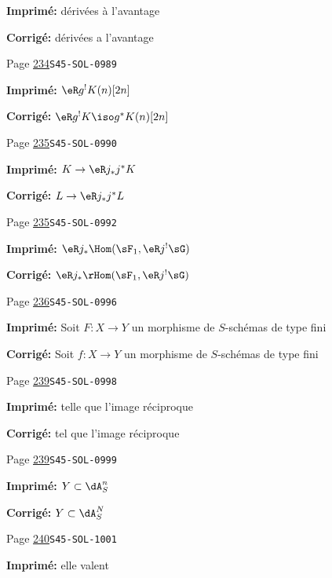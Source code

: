 \begin{description}
\par\noindent\textbf{Imprimé:} dérivées à l'avantage
\par\noindent\textbf{Corrigé:} dérivées a l'avantage
\smallskip
\item[\hypertarget{apparatus:FR-0247}{247}] Page \hyperlink{printpage:fr:234}{234}\quad\texttt{S45-SOL-0989}
\par\noindent\textbf{Imprimé:} \(\eR g^! K(n)[2 n]\)
\par\noindent\textbf{Corrigé:} \(\eR g^! K \iso g^\ast K(n)[2 n]\)
\smallskip
\item[\hypertarget{apparatus:FR-0248}{248}] Page \hyperlink{printpage:fr:235}{235}\quad\texttt{S45-SOL-0990}
\par\noindent\textbf{Imprimé:} \(K\to \eR j_\ast j^\ast K\)
\par\noindent\textbf{Corrigé:} \(L\to \eR j_\ast j^\ast L\)
\smallskip
\item[\hypertarget{apparatus:FR-0249}{249}] Page \hyperlink{printpage:fr:235}{235}\quad\texttt{S45-SOL-0992}
\par\noindent\textbf{Imprimé:} \(\eR j_\ast \Hom(\sF_1,\eR j^! \sG)\)
\par\noindent\textbf{Corrigé:} \(\eR j_\ast \rHom(\sF_1,\eR j^! \sG)\)
\smallskip
\item[\hypertarget{apparatus:FR-0250}{250}] Page \hyperlink{printpage:fr:236}{236}\quad\texttt{S45-SOL-0996}
\par\noindent\textbf{Imprimé:} Soit $F:X\to Y$ un morphisme de $S$-schémas de type fini
\par\noindent\textbf{Corrigé:} Soit $f:X\to Y$ un morphisme de $S$-schémas de type fini
\smallskip
\item[\hypertarget{apparatus:FR-0251}{251}] Page \hyperlink{printpage:fr:239}{239}\quad\texttt{S45-SOL-0998}
\par\noindent\textbf{Imprimé:} telle 
    que l'image réciproque
\par\noindent\textbf{Corrigé:} tel 
    que l'image réciproque
\smallskip
\item[\hypertarget{apparatus:FR-0252}{252}] Page \hyperlink{printpage:fr:239}{239}\quad\texttt{S45-SOL-0999}
\par\noindent\textbf{Imprimé:} \(Y\subset \dA_S^n\)
\par\noindent\textbf{Corrigé:} \(Y\subset \dA_S^N\)
\smallskip
\item[\hypertarget{apparatus:FR-0253}{253}] Page \hyperlink{printpage:fr:240}{240}\quad\texttt{S45-SOL-1001}
\par\noindent\textbf{Imprimé:} elle valent

\end{description}
